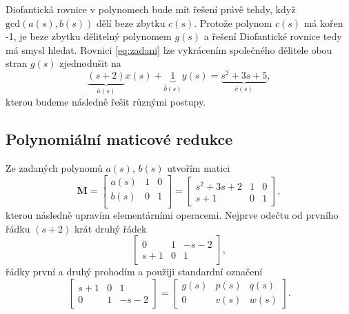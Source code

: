 \documentclass[twoside]{article}
\begin{document}
Diofantická rovnice v polynomech bude mít řešení právě tehdy, když $\text{gcd}(a(s), b(s))$ dělí beze zbytku $c(s)$. Protože polynom $c(s)$ má kořen -1,
je beze zbytku dělitelný polynomem $g(s)$ a řešení Diofantické rovnice tedy má smysl hledat.
Rovnici \eqref{eq:zadani} lze vykrácením společného dělitele obou stran $g(s)$ zjednodušit na
\begin{equation}
	\label{eq:easy}
	\underbrace{(s+2)}_{\bar{a}(s)} x(s) + \underbrace{1}_{\bar{b}(s)} y(s) = \underbrace{s^2 + 3s +5}_{\bar{c}(s)},
\end{equation}
kterou budeme následně řešit různými postupy.

\subsection{Polynomiální maticové redukce}
Ze zadaných polynomů $a(s)$, $b(s)$ utvořím matici
\begin{equation}
	\mathbf{M} = \begin{bmatrix}
		a(s) & 1 & 0 \\
		b(s) & 0 & 1 \\
	\end{bmatrix} = \begin{bmatrix}
		s^2 + 3s + 2 & 1 & 0 \\
		s+1 & 0 & 1
	\end{bmatrix},
\end{equation}
kterou následně upravím elementárními operacemi. Nejprve odečtu od prvního řádku $(s+2)$ krát druhý řádek
\begin{equation}
	\begin{bmatrix}
		0 & 1 & -s-2 \\
		s+1 & 0 & 1
	\end{bmatrix},
\end{equation}
řádky první a druhý prohodím a použiji standardní označení
\begin{equation}
	\begin{bmatrix}
		s+1 & 0 & 1 \\
		0 & 1 & -s-2 
	\end{bmatrix} = \begin{bmatrix}
		g(s) & p(s) & q(s) \\
		0 & v(s) & w(s)
	\end{bmatrix}.
\end{equation}
\end{document}
